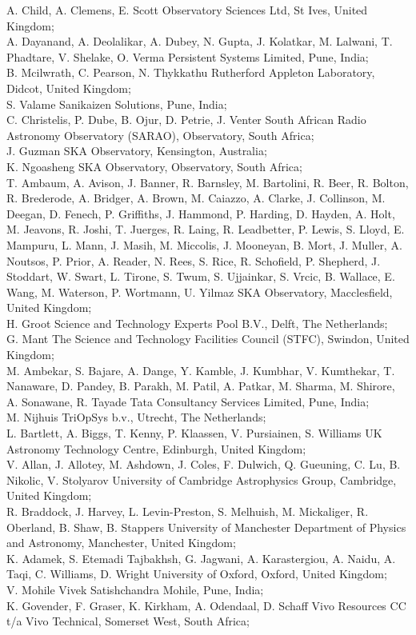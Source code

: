 \documentclass[a4paper,
               biblatex,     %
               keeplastbox,   %
               ]{jacow}
\begin{document}
A. Child,
A. Clemens,
E. Scott Observatory Sciences Ltd, St Ives, United Kingdom;\\
A. Dayanand,
A. Deolalikar,
A. Dubey,
N. Gupta,
J. Kolatkar,
M. Lalwani,
T. Phadtare,
V. Shelake,
O. Verma Persistent Systems Limited, Pune, India;\\
B. Mcilwrath,
C. Pearson,
N. Thykkathu Rutherford Appleton Laboratory, Didcot, United Kingdom;\\
S. Valame Sanikaizen Solutions, Pune, India;\\
C. Christelis,
P. Dube,
B. Ojur,
D. Petrie,
J. Venter South African Radio Astronomy Observatory (SARAO), Observatory, South Africa;\\
J. Guzman SKA Observatory, Kensington, Australia;\\
K. Ngoasheng SKA Observatory, Observatory, South Africa;\\
T. Ambaum,
A. Avison,
J. Banner,
R. Barnsley,
M. Bartolini,
R. Beer,
R. Bolton,
R. Brederode,
A. Bridger,
A. Brown,
M. Caiazzo,
A. Clarke,
J. Collinson,
M. Deegan,
D. Fenech,
P. Griffiths,
J. Hammond,
P. Harding,
D. Hayden,
A. Holt,
M. Jeavons,
R. Joshi,
T. Juerges,
R. Laing,
R. Leadbetter,
P. Lewis,
S. Lloyd,
E. Mampuru,
L. Mann,
J. Masih,
M. Miccolis,
J. Mooneyan,
B. Mort,
J. Muller,
A. Noutsos,
P. Prior,
A. Reader,
N. Rees,
S. Rice,
R. Schofield,
P. Shepherd,
J. Stoddart,
W. Swart,
L. Tirone,
S. Twum,
S. Ujjainkar,
S. Vrcic,
B. Wallace,
E. Wang,
M. Waterson,
P. Wortmann,
U. Yilmaz SKA Observatory, Macclesfield, United Kingdom;\\
H. Groot Science and Technology Experts Pool B.V., Delft, The Netherlands;\\
G. Mant The Science and Technology Facilities Council (STFC), Swindon, United Kingdom;\\
M. Ambekar,
S. Bajare,
A. Dange,
Y. Kamble,
J. Kumbhar,
V. Kumthekar,
T. Nanaware,
D. Pandey,
B. Parakh,
M. Patil,
A. Patkar,
M. Sharma,
M. Shirore,
A. Sonawane,
R. Tayade Tata Consultancy Services Limited, Pune, India;\\
M. Nijhuis TriOpSys b.v., Utrecht, The Netherlands;\\
L. Bartlett,
A. Biggs,
T. Kenny,
P. Klaassen,
V. Pursiainen,
S. Williams UK Astronomy Technology Centre, Edinburgh, United Kingdom;\\
V. Allan,
J. Allotey,
M. Ashdown,
J. Coles,
F. Dulwich,
Q. Gueuning,
C. Lu,
B. Nikolic,
V. Stolyarov University of Cambridge Astrophysics Group, Cambridge, United Kingdom;\\
R. Braddock,
J. Harvey,
L. Levin-Preston,
S. Melhuish,
M. Mickaliger,
R. Oberland,
B. Shaw,
B. Stappers University of Manchester Department of Physics and Astronomy, Manchester, United Kingdom;\\
K. Adamek,
S. Etemadi Tajbakhsh,
G. Jagwani,
A. Karastergiou,
A. Naidu,
A. Taqi,
C. Williams,
D. Wright University of Oxford, Oxford, United Kingdom;\\
V. Mohile Vivek Satishchandra Mohile, Pune, India;\\
K. Govender,
F. Graser,
K. Kirkham,
A. Odendaal,
D. Schaff Vivo Resources CC t/a Vivo Technical, Somerset West, South Africa;

\printbibliography
\end{document}
